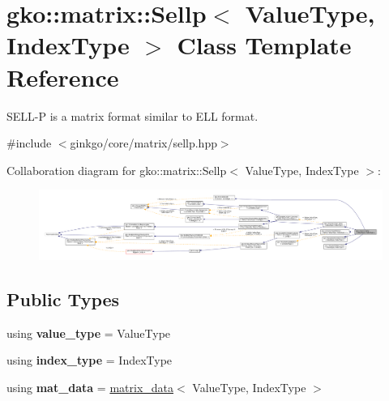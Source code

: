 \hypertarget{classgko_1_1matrix_1_1Sellp}{}\section{gko\+:\+:matrix\+:\+:Sellp$<$ Value\+Type, Index\+Type $>$ Class Template Reference}
\label{classgko_1_1matrix_1_1Sellp}


S\+E\+L\+L-\/P is a matrix format similar to E\+LL format.  




{\ttfamily \#include $<$ginkgo/core/matrix/sellp.\+hpp$>$}



Collaboration diagram for gko\+:\+:matrix\+:\+:Sellp$<$ Value\+Type, Index\+Type $>$\+:
\nopagebreak
\begin{figure}[H]
\begin{center}
\leavevmode
\includegraphics[width=350pt]{classgko_1_1matrix_1_1Sellp__coll__graph}
\end{center}
\end{figure}
\subsection*{Public Types}
\begin{DoxyCompactItemize}
\item 
\mbox{\label{classgko_1_1matrix_1_1Sellp_ac220b4c6cb098b81164a671e6683e5c0}} 
using {\bfseries value\+\_\+type} = Value\+Type
\item 
\mbox{\label{classgko_1_1matrix_1_1Sellp_af653158fd8d14e9d9dfee7b2a098fefe}} 
using {\bfseries index\+\_\+type} = Index\+Type
\item 
\mbox{\label{classgko_1_1matrix_1_1Sellp_a4a819a93dec5ca81e7e79b805f88d14e}} 
using {\bfseries mat\+\_\+data} = \hyperlink{structgko_1_1matrix__data}{matrix\+\_\+data}$<$ Value\+Type, Index\+Type $>$
\end{DoxyCompactItemize}
